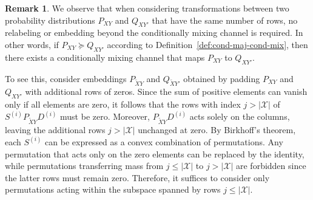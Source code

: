 \documentclass[aps,pra,11pt,onecolumn,nofootinbib,tightenlines]{revtex4-2}
\theoremstyle{definition}
\newtheorem{remark}[theorem]{Remark}
\begin{document}
\begin{remark}
\label{remark: no isometries}
We observe that when considering transformations between two probability distributions \(P_{XY}\) and \(Q_{XY'}\) that have the same number of rows, no relabeling or embedding beyond the conditionally mixing channel is required. In other words, if \(P_{XY} \succeq Q_{XY'}\) according to Definition~\ref{def:cond-maj-cond-mix}, then there exists a conditionally mixing channel that maps \(P_{XY}\) to \(Q_{XY'}\).

To see this, consider embeddings \(P_{\widetilde{X}Y}\) and \(Q_{\widetilde{X}Y'}\) obtained by padding \(P_{XY}\) and \(Q_{XY'}\) with additional rows of zeros. Since the sum of positive elements can vanish only if all elements are zero, it follows that the rows with index \(j > |\mathcal{X}|\) of $S^{(i)} P_{\widetilde{X}Y} D^{(i)}$
must be zero. Moreover, \(P_{\widetilde{X}Y} D^{(i)}\) acts solely on the columns, leaving the additional rows \(j > |\mathcal{X}|\) unchanged at zero. By Birkhoff's theorem, each \(S^{(i)}\) can be expressed as a convex combination of permutations. Any permutation that acts only on the zero elements can be replaced by the identity, while permutations transferring mass from \(j \leq |\mathcal{X}|\) to \(j > |\mathcal{X}|\) are forbidden since the latter rows must remain zero. Therefore, it suffices to consider only permutations acting within the subspace spanned by rows \(j \leq |\mathcal{X}|\).
\end{remark}
\end{document}
